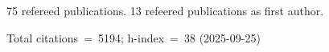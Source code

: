 75 refereed publications. 13 refeered publications as first author.

Total citations~=~5194; h-index~=~38 (2025-09-25)